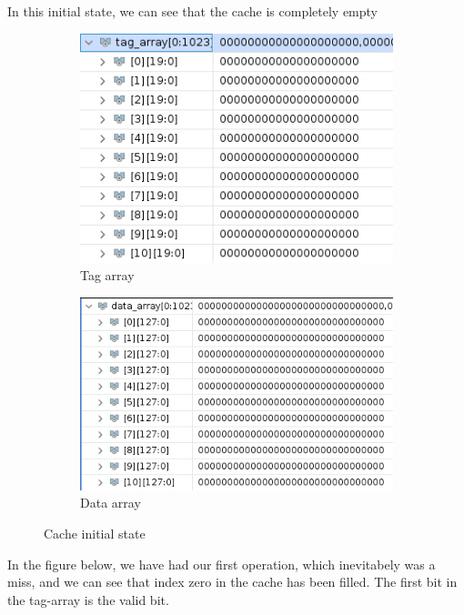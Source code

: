 \documentclass{article}
\begin{document}
In this initial state, we can see that the cache is completely empty
\begin{figure}[H]
\centering
\begin{subfigure}{.5\textwidth}
  \centering
  \includegraphics[width=.8\linewidth]{img/tag0.png}
  \caption{Tag array}
\end{subfigure}%
\begin{subfigure}{.5\textwidth}
  \centering
  \includegraphics[width=.9\linewidth]{img/data0.png}
  \caption{Data array}
\end{subfigure}
\caption{Cache initial state}
\end{figure}


In the figure below, we have had our first operation, which inevitabely was a miss, and we can see that index zero in the cache has been filled. The first bit in the tag-array is the valid bit.
\end{document}
